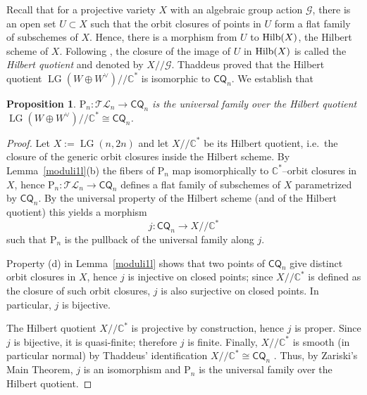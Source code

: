 \documentclass[10pt]{amsart}
\newtheorem{proposition}[theorem]{Proposition}
\theoremstyle{definition}
\newcommand{\LG}{\operatorname{LG}}
\newcommand{\CQ}{\mathsf{CQ}}
\newcommand{\TL}{\mathcal{TL}}
\newcommand{\PL}{\mathrm{P}}
\theoremstyle{plain} %
\begin{document}
Recall that for a projective variety $X$ with an algebraic group action $\mathscr G$, there is an open set $U \subset X$ such that the orbit closures of points in $U$ form a flat family of subschemes of $X$. Hence, there is a morphism from $U$ to ${\rm Hilb}(X)$, the Hilbert scheme of $X$. Following \cite{BS,Kap}, the closure of the image of $U$ in ${\rm Hilb}(X)$ is called the {\it Hilbert quotient} and denoted by $X\! /\!/\mathscr G$. Thaddeus \cite{Th1} proved that the Hilbert quotient $\LG(W \oplus W^\vee)\! /\!/\mathbb C^*$ is isomorphic to $\CQ_n$.
%
We establish that
\begin{proposition}\label{modulil}  $\PL_{n}\colon\TL_n\rightarrow\CQ_n$ is the universal family over the Hilbert quotient $\LG(W \oplus W^\vee)\! /\!/\mathbb C^*\cong\CQ_n$.
\end{proposition}
\begin{proof}
Let $X:=\LG(n,2n)$ and let $X/\!/\mathbb C^*$ be its Hilbert quotient, i.e.\ the closure of the generic orbit closures inside the Hilbert scheme.
By Lemma~\ref{moduli1l}\textup{(b)} the fibers of $\PL_n$ map isomorphically to $\mathbb C^*$--orbit closures in $X$, hence $\PL_n\colon \TL_n\to\CQ_n$ defines a flat family of subschemes of $X$ parametrized by $\CQ_n$.
By the universal property of the Hilbert scheme (and of the Hilbert quotient) this yields a morphism
\[
j\colon \CQ_n \longrightarrow X/\!/\mathbb C^*
\]
such that $\PL_n$ is the pullback of the universal family along $j$.

Property \textup{(d)} in Lemma~\ref{moduli1l} shows that two points of $\CQ_n$ give distinct orbit closures in $X$, hence $j$ is injective on closed points; since $X/\!/\mathbb C^*$ is defined as the closure of such orbit closures, $j$ is also surjective on closed points. In particular, $j$ is bijective.

The Hilbert quotient $X/\!/\mathbb C^*$ is projective by construction, hence $j$ is proper. Since $j$ is bijective, it is quasi-finite; therefore $j$ is finite. Finally, $X/\!/\mathbb C^*$ is smooth (in particular normal) by Thaddeus' identification $X/\!/\mathbb C^*\cong \CQ_n$ \cite{Th1}. Thus, by Zariski's Main Theorem, $j$ is an isomorphism and $\PL_n$ is the universal family over the Hilbert quotient.
\end{proof}
\end{document}
